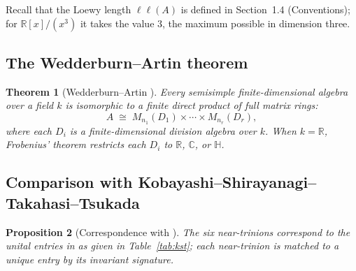 \documentclass{amsart}
\theoremstyle{plain}
\newtheorem{theorem}{Theorem}[section]
\newtheorem{proposition}[theorem]{Proposition}
\theoremstyle{definition}
\theoremstyle{remark}
\newcommand{\RR}{\mathbb{R}}
\newcommand{\CC}{\mathbb{C}}
\newcommand{\HH}{\mathbb{H}}
\newcommand{\LL}{\ell\ell}
\begin{document}
Recall that the Loewy length $\LL(A)$ is defined in Section~1.4
(Conventions); for $\RR[x]/(x^3)$ it takes the value $3$, the maximum
possible in dimension three.

\subsection{The Wedderburn--Artin theorem}

\begin{theorem}[Wedderburn--Artin {\cite{Wedderburn1908,Pierce1982}}]
  \label{thm:wa}
  Every semisimple finite-dimensional algebra over a field $k$ is isomorphic
  to a finite direct product of full matrix rings:
  \[
    A \;\cong\; M_{n_1}(D_1) \times \cdots \times M_{n_r}(D_r),
  \]
  where each $D_i$ is a finite-dimensional division algebra over $k$.
  When $k = \RR$, Frobenius' theorem restricts each $D_i$ to
  $\RR$, $\CC$, or $\HH$.
\end{theorem}

\subsection{Comparison with Kobayashi--Shirayanagi--Takahasi--Tsukada}
\label{sec:kst}

\begin{proposition}[Correspondence with {\cite{Kobayashi2021}}]
  \label{prop:kst}
  The six near-trinions correspond to the unital entries in
  \cite{Kobayashi2021} as given in Table~\ref{tab:kst}; each
  near-trinion is matched to a unique entry by its invariant signature.
\end{proposition}
\end{document}
